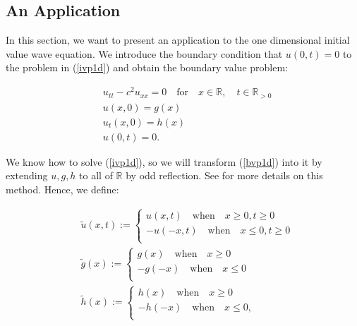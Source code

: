 \documentclass[a4paper, 12pt]{article}
\numberwithin{equation}{section}
\begin{document}
\subsection{An Application} \label{anapplication}
In this section, we want to present an application to the one dimensional initial value wave equation. We introduce the boundary condition that
$u(0,t)=0$ to the problem in (\ref{ivp1d}) and obtain the boundary value problem:

\begin{equation} \label{bvp1d}
    \begin{aligned}
    &u_{tt}-c^2u_{xx}=0 \quad \textrm {for} \quad x \in \mathbb{R}, \quad t \in \mathbb{R}_{>0}\\
    &u(x,0)=g(x)\\
    &u_t(x,0)=h(x)\\
    &u(0,t)=0.
    \end{aligned}
\end{equation}

We know how to solve (\ref{ivp1d}), so we will transform (\ref{bvp1d}) into it by extending $u,g,h$ to all of $\mathbb{R}$ by odd reflection. See \cite{Ev} for more details on this method.
Hence, we define:

\begin{equation*}
    \begin{aligned}
        &\tilde{u}(x,t):=
        \begin{cases}
            u(x,t) \quad \textrm{when} \quad x \ge 0, t \ge 0\\
            -u(-x,t) \quad \textrm{when} \quad x \le 0, t \ge 0\\
        \end{cases}
        \\
        &\tilde{g}(x):=
        \begin{cases}
            g(x) \quad \textrm{when} \quad x \ge 0\\
            -g(-x) \quad \textrm{when} \quad x \le 0\\
        \end{cases}
        \\
        &\tilde{h}(x):=
        \begin{cases}
            h(x) \quad \textrm{when} \quad x \ge 0\\
            -h(-x) \quad \textrm{when} \quad x \le 0,\\
        \end{cases}
    \end{aligned}
\end{equation*}
\end{document}
